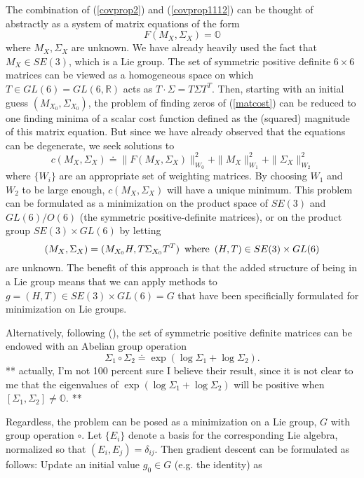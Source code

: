\documentclass[twocolumn,10pt]{asme2ej}
\begin{document}
The combination of (\ref{covprop2}) and (\ref{covprop1112}) can be thought of abstractly as a system of matrix equations
of the form 
\begin{equation}
F(M_X, \Sigma_X) = \mathbb{O}
\label{matcost}
\end{equation}
where $M_X, \Sigma_X$ are unknown. We have already heavily used the fact that $M_X \in SE(3)$,
which is a Lie group. The set of symmetric positive definite $6\times 6$ matrices can be viewed as a homogeneous space on which $T \in GL(6) = GL(6,\mathbb{R})$
acts as $T\cdot \Sigma = T \Sigma T^T$. Then, starting with an initial guess $(M_{X_0}, \Sigma_{X_0})$, the problem of finding zeros of
(\ref{matcost}) can be reduced to one finding minima of a scalar cost function defined as the (squared) magnitude of this matrix equation.
But since we have already observed that the equations can be degenerate, we seek solutions to 
\begin{equation}
c(M_X, \Sigma_X) \doteq \|F(M_X, \Sigma_X)\|_{W_0}^2 + \|M_X\|_{W_1}^2 + \|\Sigma_X\|_{W_2}^2
\label{scalarcost}
\end{equation}
where $\{W_i\}$ are an appropriate set of weighting matrices. By choosing $W_1$ and $W_2$ to be large enough, $c(M_X, \Sigma_X)$ will have a unique minimum.
This problem can be formulated as a minimization on the product space of $SE(3)$ and $GL(6)/O(6)$ (the symmetric positive-definite matrices), or
on the product group $SE(3) \times GL(6)$ by letting 
$$ (M_X, \Sigma_X) = (M_{X_0} H, T \Sigma_{X_0} T^T) \,\,\, {\rm where}  \,\,\, (H,T) \in SE(3) \times GL(6)
$$
are unknown. The benefit of this approach is that the added structure of being in a Lie group means that we can apply methods to
$g = (H,T) \in SE(3) \times GL(6) = G$ that have been specificially formulated for minimization on Lie groups. 

Alternatively, following (\cite{Pennec, leite}), the set of symmetric positive definite matrices can be endowed with
an Abelian group operation
$$ \Sigma_1 \circ \Sigma_2 \doteq \exp(\log \Sigma_1 + \log \Sigma_2). $$
** actually, I'm not 100 percent sure I believe their result, since it is not clear to me that the eigenvalues of $\exp(\log \Sigma_1 + \log \Sigma_2)$
will be positive when $[\Sigma_1, \Sigma_2] \neq \mathbb{O}$. 
 **

Regardless, the problem can be posed as a minimization on a Lie group, $G$ with group operation $\circ$. Let $\{E_i\}$ denote a basis for the corresponding Lie algebra,
normalized so that $(E_i, E_j) = \delta_{ij}$. Then gradient descent can be formulated as follows:
Update an initial value $g_0 \in G$ (e.g. the identity) as
\end{document}
